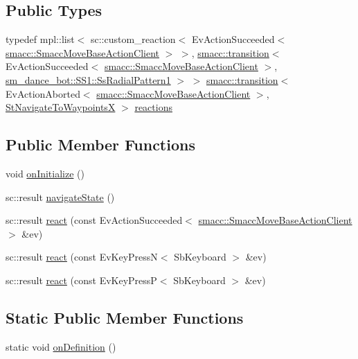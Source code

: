 \subsection*{Public Types}
\begin{DoxyCompactItemize}
\item 
typedef mpl\+::list$<$ sc\+::custom\+\_\+reaction$<$ Ev\+Action\+Succeeded$<$ \hyperlink{classsmacc_1_1SmaccMoveBaseActionClient}{smacc\+::\+Smacc\+Move\+Base\+Action\+Client} $>$ $>$, \hyperlink{classsmacc_1_1transition}{smacc\+::transition}$<$ Ev\+Action\+Succeeded$<$ \hyperlink{classsmacc_1_1SmaccMoveBaseActionClient}{smacc\+::\+Smacc\+Move\+Base\+Action\+Client} $>$, \hyperlink{structsm__dance__bot_1_1SS1_1_1SsRadialPattern1}{sm\+\_\+dance\+\_\+bot\+::\+S\+S1\+::\+Ss\+Radial\+Pattern1} $>$ $>$ \hyperlink{classsmacc_1_1transition}{smacc\+::transition}$<$ Ev\+Action\+Aborted$<$ \hyperlink{classsmacc_1_1SmaccMoveBaseActionClient}{smacc\+::\+Smacc\+Move\+Base\+Action\+Client} $>$, \hyperlink{structStNavigateToWaypointsX}{St\+Navigate\+To\+WaypointsX} $>$ \hyperlink{structStNavigateToWaypointsX_abaf7552998d2bc53a05123da220fa17e}{reactions}
\end{DoxyCompactItemize}
\subsection*{Public Member Functions}
\begin{DoxyCompactItemize}
\item 
void \hyperlink{structStNavigateToWaypointsX_ac5f251c0431495e14c458a298592b663}{on\+Initialize} ()
\item 
sc\+::result \hyperlink{structStNavigateToWaypointsX_a0df2892ed95cae253b2ae0c09c850268}{navigate\+State} ()
\item 
sc\+::result \hyperlink{structStNavigateToWaypointsX_a9d8d8e362b587429680ea2800a6c181c}{react} (const Ev\+Action\+Succeeded$<$ \hyperlink{classsmacc_1_1SmaccMoveBaseActionClient}{smacc\+::\+Smacc\+Move\+Base\+Action\+Client} $>$ \&ev)
\item 
sc\+::result \hyperlink{structStNavigateToWaypointsX_ab9973901dfb0db2035223ec81d6fe0df}{react} (const Ev\+Key\+PressN$<$ Sb\+Keyboard $>$ \&ev)
\item 
sc\+::result \hyperlink{structStNavigateToWaypointsX_aa2d1a8c49b4c3227201eb300e21e53c1}{react} (const Ev\+Key\+PressP$<$ Sb\+Keyboard $>$ \&ev)
\end{DoxyCompactItemize}
\subsection*{Static Public Member Functions}
\begin{DoxyCompactItemize}
\item 
static void \hyperlink{structStNavigateToWaypointsX_a0698c15b3241c4aa15a4f5380365e72d}{on\+Definition} ()
\end{DoxyCompactItemize}
